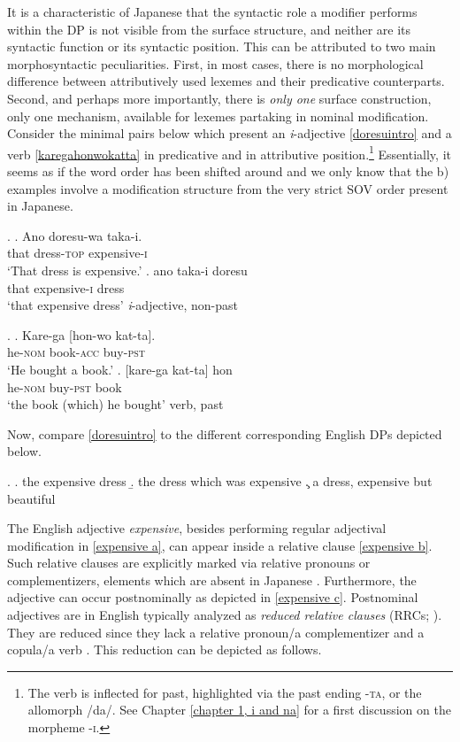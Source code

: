 \documentclass [output=book,colorlinks,citecolor=brown]{langscibook}
\begin{document}
It is a characteristic of Japanese that the syntactic role a modifier performs within the DP is not visible from the surface structure, and neither are its syntactic function or its syntactic position. This can be attributed to two main morphosyntactic peculiarities. First, in most cases, there is no morphological difference between attributively used lexemes and their predicative counterparts. Second, and perhaps more importantly, there is \textit{only one} surface construction, only one mechanism, available for lexemes partaking in nominal modification. Consider the minimal pairs below which present an \textit{i}-adjective \ref{doresuintro} and a verb \ref{karegahonwokatta} in predicative and in attributive position.\footnote{The verb is inflected for past, highlighted via the past ending -\textsc{ta}, or the allomorph /da/. See Chapter \ref{chapter 1, i and na} for a first discussion on the morpheme -\textsc{i}.} Essentially, it seems as if the word order has been shifted around and we only know that the b) examples involve a modification structure from the very strict SOV order present in Japanese.

\ex. \label{doresuintro} \ag. Ano doresu-wa taka-i.\\
that dress-\textsc{top} expensive-\textsc{i}\\
`That dress is expensive.'
\bg. ano taka-i doresu\\
that expensive-\textsc{i} dress\\
`that expensive dress' \null \hfill \textit{i}-adjective, non-past

\ex. \label{karegahonwokatta} \ag. Kare-ga [hon-wo kat-ta].\\
he-\textsc{nom} book-\textsc{acc} buy-\textsc{pst}\\
`He bought a book.’
\bg. [kare-ga kat-ta] hon\\
he-\textsc{nom} buy-\textsc{pst} book\\
`the book (which) he bought' \null \hfill verb, past \label{kare-ga}

Now, compare \ref{doresuintro} to the different corresponding English DPs depicted below.

\ex. \a. the expensive dress \label{expensive a}
\b. the dress which was expensive \label{expensive b}
\c. a dress, expensive but beautiful \label{expensive c}

The English adjective \textit{expensive}, besides performing regular adjectival modification in \ref{expensive a}, can appear inside a relative clause \ref{expensive b}. Such relative clauses are explicitly marked via relative pronouns or complementizers, elements which are absent in Japanese \citep{kuno:1973:structure, comrie:1998:rethinking}. Furthermore, the adjective can occur postnominally as depicted in \ref{expensive c}. Postnominal adjectives are in English typically analyzed as \textit{reduced relative clauses} (RRCs; \citealt{sadler:1994:prenominal, larson:1998:events, cinque:2010:adj}). They are reduced since they lack a relative pronoun/a complementizer and a copula/a verb \citep{douglas:2016:syntactic, harwood:2018:rrc}. This reduction can be depicted as follows. %
\end{document}
